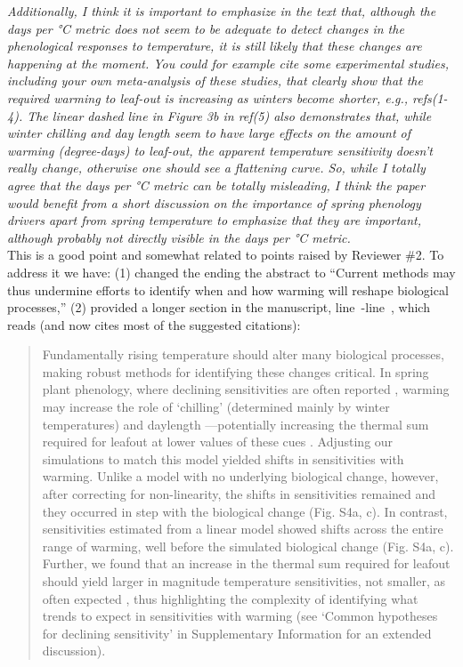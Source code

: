 \documentclass[11pt]{article}
\newcommand{\lr}[1]{line~\lineref{#1}}
\begin{document}
\emph{Additionally, I think it is important to emphasize in the text that, although the days per °C metric does not seem to be adequate to detect changes in the phenological responses to temperature, it is still likely that these changes are happening at the moment. You could for example cite some experimental studies, including your own meta-analysis of these studies, that clearly show that the required warming to leaf-out is increasing as winters become shorter, e.g., refs(1-4). The linear dashed line in Figure 3b in ref(5) also demonstrates that, while winter chilling and day length seem to have large effects on the amount of warming (degree-days) to leaf-out, the apparent temperature sensitivity doesn't really change, otherwise one should see a flattening curve. So, while I totally agree that the days per °C metric can be totally misleading, I think the paper would benefit from a short discussion on the importance of spring phenology drivers apart from spring temperature to
emphasize that they are important, although probably not directly visible in the days per °C metric.}\\

This is a good point and somewhat related to points raised by Reviewer \#2. To address it we have: (1) changed the ending the abstract to ``Current methods may thus undermine efforts to identify when and how warming will reshape biological processes,'' (2) provided a longer section in the manuscript, \lr{biomattersstart}-\lr{biomattersend}, which reads (and now cites most of the suggested citations):

\begin{quote}
Fundamentally rising temperature should alter many biological processes, making robust methods for identifying these changes critical. In spring plant phenology, where declining sensitivities are often reported \citep{fu2015,piao2017,dai2019ag}, warming may increase the role of `chilling' (determined mainly by winter temperatures) and daylength \citep{Laube:2014a,zohner2016}---potentially increasing the thermal sum required for leafout at lower values of these cues \citep{Polgar2014,zohner2017,flynn2018}. Adjusting our simulations to match this model yielded shifts in sensitivities with warming. Unlike a model with no underlying biological change, however, after correcting for non-linearity, the shifts in sensitivities remained and they occurred in step with the biological change (Fig. S4a, c). In contrast, sensitivities estimated from a linear model showed shifts across the entire range of warming, well before the simulated biological change (Fig. S4a, c). Further, we found that an increase in the thermal sum required for leafout should yield larger in magnitude temperature sensitivities, not smaller, as often expected \citep[e.g.,][]{fu2015}, thus highlighting the complexity of identifying what trends to expect in sensitivities with warming (see `Common hypotheses for declining sensitivity' in Supplementary Information for an extended discussion).
\end{quote}
\end{document}
